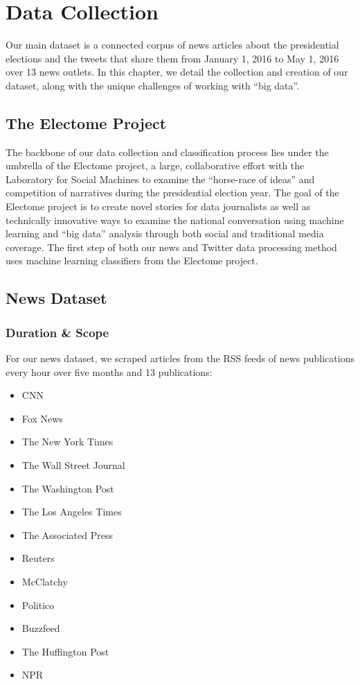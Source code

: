  \chapter{Data Collection}
 Our main dataset is a connected corpus of news articles about the presidential elections and the tweets that share them from January 1, 2016 to May 1, 2016 over 13 news outlets. In this chapter, we detail the collection and creation of our dataset, along with the unique challenges of working with ``big data''.

\section{The Electome Project}
The backbone of our data collection and classification process lies under the umbrella of the Electome project, a large, collaborative effort with the Laboratory for Social Machines to examine the ``horse-race of ideas'' and competition of narratives during the presidential election year. The goal of the Electome project is to create novel stories for data journalists as well as technically innovative ways to examine the national conversation using machine learning and ``big data'' analysis through both social and traditional media coverage. The first step of both our news and Twitter data processing method uses machine learning classifiers from the Electome project.

\section{News Dataset}

 \subsection{Duration \& Scope}
 For our news dataset, we scraped articles from the RSS feeds of news publications every hour over five months and 13 publications:

\begin{multicols}{2}
\begin{itemize}

\item CNN
\item Fox News
\item The New York Times
\item The Wall Street Journal
\item The Washington Post
\item The Los Angeles Times 
\item The Associated Press
\item Reuters
\item McClatchy 
\item Politico 
\item Buzzfeed
\item The Huffington Post
\item NPR 
\end{itemize}
\end{multicols}

